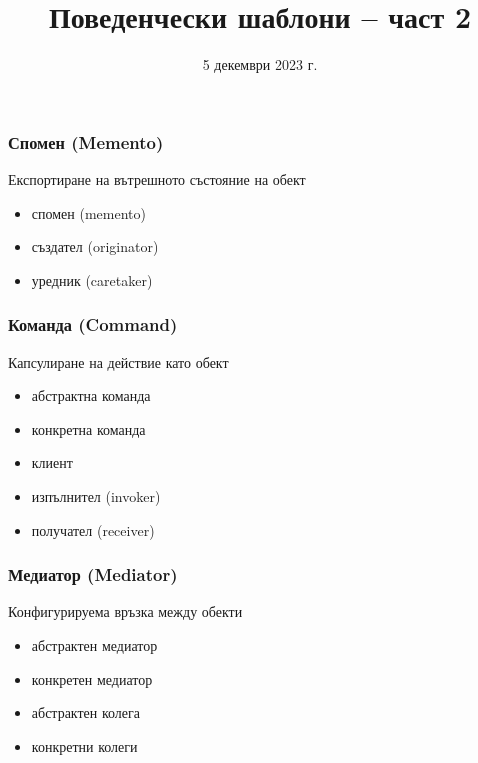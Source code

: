 \documentclass[alsotrans]{beamerswitch}
\title{Поведенчески  шаблони -- част 2}
\date{5 декември 2023 г.}
\begin{document}
\begin{frame}
  \titlepage
\end{frame}

\begin{frame}
  \frametitle{Спомен (Memento)}

  \begin{purpose}
    Експортиране на вътрешното състояние на обект
  \end{purpose}

  \pause
  \vpsace{2ex}
  \comps
  \begin{itemize}
  \item спомен (memento)
  \item създател (originator)
  \item уредник (caretaker)
  \end{itemize}
\end{frame}

\begin{frame}
  \frametitle{Команда (Command)}

  \begin{purpose}
    Капсулиране на действие като обект
  \end{purpose}

  \pause
  \vspace{2ex}
  \comps
  \begin{itemize}[<+->]
  \item абстрактна команда
  \item конкретна команда
  \item клиент
  \item изпълнител (invoker)
  \item получател (receiver)
  \end{itemize}
\end{frame}

\begin{frame}
  \frametitle{Медиатор (Mediator)}

  \begin{purpose}
    Конфигурируема връзка между обекти
  \end{purpose}

  \pause
  \vspace{2ex}
  \comps
  \begin{itemize}[<+->]
  \item абстрактен медиатор
  \item конкретен медиатор
  \item абстрактен колега
  \item конкретни колеги
  \end{itemize}
\end{frame}
\end{document}
